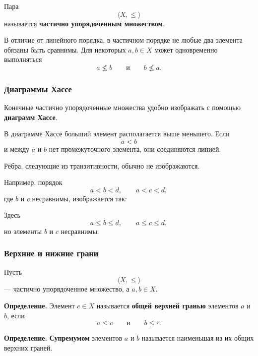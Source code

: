\documentclass[12pt,a4paper,oneside,openany]{book}
\theoremstyle{definition}
\theoremstyle{plain}
\theoremstyle{remark}
\begin{document}
Пара
\[
\langle X,\leq\rangle
\]
называется \textbf{частично упорядоченным множеством}.

В отличие от линейного порядка, в частичном порядке не любые два
элемента обязаны быть сравнимы. Для некоторых \(a,b\in X\) может
одновременно выполняться
\[
a\nleq b
\qquad\text{и}\qquad
b\nleq a.
\]

\subsubsection{Диаграммы Хассе}

Конечные частично упорядоченные множества удобно изображать с помощью
\textbf{диаграмм Хассе}.

В диаграмме Хассе больший элемент располагается выше меньшего.
Если
\[
a<b
\]
и между \(a\) и \(b\) нет промежуточного элемента, они соединяются
линией.

Рёбра, следующие из транзитивности, обычно не изображаются.

Например, порядок
\[
a<b<d,
\qquad
a<c<d,
\]
где \(b\) и \(c\) несравнимы, изображается так:

\begin{center}
\end{center}

Здесь
\[
a\leq b\leq d,
\qquad
a\leq c\leq d,
\]
но элементы \(b\) и \(c\) несравнимы.

\subsubsection{Верхние и нижние грани}

Пусть
\[
\langle X,\leq\rangle
\]
--- частично упорядоченное множество, а \(a,b\in X\).

\textbf{Определение.}
Элемент \(c\in X\) называется \textbf{общей верхней гранью}
элементов \(a\) и \(b\), если
\[
a\leq c
\qquad\text{и}\qquad
b\leq c.
\]

\textbf{Определение.}
\textbf{Супремумом} элементов \(a\) и \(b\) называется наименьшая
из их общих верхних граней.
\end{document}
